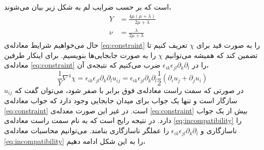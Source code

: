 است که بر حسب ضرایب لم به شکل زیر بیان می‌شوند،
\begin{equation}
\begin{aligned}
Y&=\frac{4\mu(\mu+\lambda)}{2\mu+\lambda}\\
\nu&=\frac{\lambda}{2\mu+\lambda}
\label{eq:younglame}
\end{aligned}
\end{equation}
حال می‌خواهیم شرایط معادله‌ی 
\ref{eq:constraint}
را به صورت قید برای $\chi$
تعریف کنیم تا تضمین کند که همیشه می‌توانیم $\chi$
را به صورت جابجایی‌ها بنویسیم. برای اینکار طرفین معادله‌ی 
\ref{eq:constraint}
را در 
$\epsilon_{ik}\epsilon_{jl}\partial_k\partial_l$
ضرب می‌کنیم که نتیجه‌ی آن،
\begin{equation}
\frac{1}{Y}\nabla^4\chi=\epsilon_{ik}\epsilon_{jl}\partial_k\partial_lu_{ij}=\epsilon_{ik}\epsilon_{jl}\partial_k\partial_l\frac{1}{2}(\partial_iu_j+\partial_ju_i)
\label{eq:incompatibility}
\end{equation}
در صورتی که سمت راست معادله‌ی فوق برابر با صفر شود، می‌توان گفت که $u_{ij}$ 
سازگار است و تنها یک جواب برای میدان جابجایی وجود دارد که جواب معادله‌ی 
\ref{eq:constraint}
است. در غیر این صورت معدله‌ی 
\ref{eq:constraint}
بیش از یک جواب دارد. در نتیجه رایج است که به نام سمت راست معادله‌ی
\ref{eq:incompatibility}
را ناسازگاری
و $\epsilon_{ik}\epsilon_{jl}\partial_k\partial_l$
را عملگر ناسازگاری بنامند. می‌توانیم محاسبات معادله‌ی 
\ref{eq:incompatibility}
را به این شکل ادامه دهیم،

